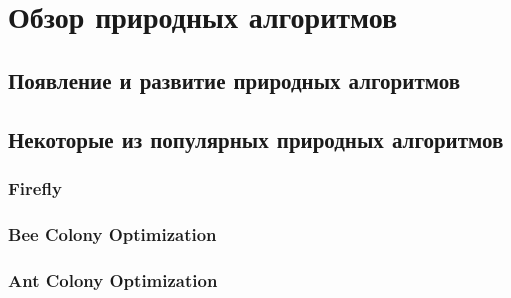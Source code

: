 \setcounter{chapter}{1}
\setcounter{section}{0}
\chapter*{Обзор природных алгоритмов}\label{Chapter:Bio}


\section{Появление и развитие природных алгоритмов}


\section{Некоторые из популярных природных алгоритмов}
\subsection{Firefly}
\subsection{Bee Colony Optimization}
\subsection{Ant Colony Optimization}